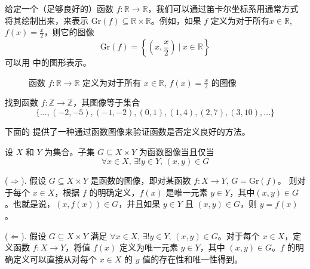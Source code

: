 \begin{example}
\label{exGraphsOfFunctionsRToR}
给定一个（足够良好的）函数 $f : \mathbb{R} \to \mathbb{R}$，我们可以通过笛卡尔坐标系用通常方式将其绘制出来，来表示 $\mathrm{Gr}(f) \subseteq \mathbb{R} \times \mathbb{R}$。例如，如果 $f$ 定义为对于所有$x \in \mathbb{R}$, $f(x)=\frac{x}{2}$，则它的图像
\[ \mathrm{Gr}(f) = \left\{ \left( x, \frac{x}{2} \right) \ \bigg|\ x \in \mathbb{R} \right\} \]
可以用  中的图形表示。

\begin{figure}[H]
\centering
{}
\caption{函数 $f : \mathbb{R} \to \mathbb{R}$ 定义为对于所有 $x \in \mathbb{R}$, $f(x) = \frac{x}{2}$ 的图像 }
\label{figGraphOfXOverTwo}
\end{figure}
\end{example}

\begin{exercise}
找到函数 $f : \mathbb{Z} \to \mathbb{Z}$，其图像等于集合
\[ \{ \dots, ({-2}, {-5}), ({-1}, {-2}), (0, 1), (1, 4), (2, 7), (3, 10), \dots \} \]
\end{exercise}

下面的  提供了一种通过函数图像来验证函数是否定义良好的方法。

\begin{theorem}
\label{thmFunctionsAsGraphs}
设 $X$ 和 $Y$ 为集合。子集 $G \subseteq X \times Y$ 为函数图像当且仅当
\[ \forall x \in X,\, \exists ! y \in Y,\, (x,y) \in G \]
\end{theorem}
\begin{cproof}
($\Rightarrow$). 假设 $G \subseteq X \times Y$ 是函数的图像，即对某函数 $f : X \to Y$, $G = \mathrm{Gr}(f)$。 则对于每个 $x \in X$，根据 $f$ 的明确定义，$f(x)$ 是唯一元素 $y \in Y$，其中$(x, y) \in G$。也就是说，$(x,f(x)) \in G$，并且如果 $y \in Y$ 且 $(x,y) \in G$，则 $y=f(x)$。

($\Leftarrow$). 假设 $G \subseteq X \times Y$ 满足 $\forall x \in X,\, \exists ! y \in Y,\, (x,y) \in G$。对于每个 $x \in X$，定义函数 $f : X \to Y$，将值 $f(x)$ 定义为唯一元素 $y \in Y$，其中 $(x,y) \in G$。$f$ 的明确定义可以直接从对每个 $x \in X$ 的 $y$ 值的存在性和唯一性得到。
\end{cproof}

